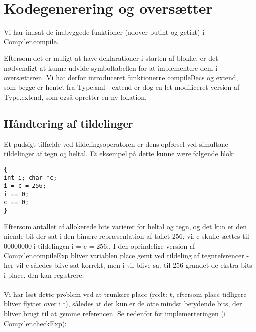 \documentclass[10pt,a4paper,danish]{article}
\begin{document}
\begin{verbatim}

\end{verbatim} 

\section{Kodegenerering og oversætter}
Vi har indsat de indbyggede funktioner (udover putint og getint) i 
Compiler.compile. 

Eftersom det er muligt at have deklarationer i starten af blokke, er det 
nødvendigt at kunne udvide symboltabellen for at implementere dem i 
oversætteren. Vi har derfor introduceret funktionerne compileDecs og 
extend, som begge er hentet fra Type.sml - extend er dog 
en let modificeret version af Type.extend,  som også
opretter en ny lokation.  

\subsection{Håndtering af tildelinger}
Et pudsigt tilfælde ved tildelingsoperatoren er dens opførsel ved 
simultane tildelinger af tegn og heltal. Et eksempel på dette kunne
være følgende blok: 

\begin{verbatim}
{
int i; char *c;
i = c = 256;
i == 0;
c == 0;
}
\end{verbatim}

Eftersom antallet af allokerede bits varierer for heltal og tegn, 
og det kun er den niende bit der sat i den binære repræsentation
af tallet 256, vil c skulle sættes til 00000000 i tildelingen
i = c = 256;. I den oprindelige version af Compiler.compileExp
bliver variablen place gemt ved  tildeling af tegnreferencer - 
her vil c således blive sat korrekt, men i vil blive sat til 
256 grundet de ekstra bits i place, den kan registrere. 

\paragraph{}
Vi har løst dette problem ved at trunkere place (reelt: t, eftersom
place tidligere bliver flyttet over i t), således at det kun er de
otte mindst betydende bits, der bliver brugt til at gemme referencen. 
Se nedenfor for implementeringen (i Compiler.checkExp):

\begin{verbatim}

\end{verbatim}
\end{document}
